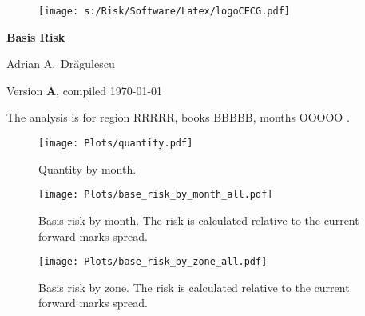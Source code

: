 \documentclass[letterpaper,10pt]{article}
\newcommand{\region}{RRRRR}
\newcommand{\book}{BBBBB}
\begin{document}
\begin{figure}
\texttt{[image: s:/Risk/Software/Latex/logoCECG.pdf]}
\hfill
{}
\end{figure}
 
\vspace*{0.5in}
\begin{center}
\LARGE\bf{Basis Risk}
\end{center}
\begin{center}
   Adrian A.\ Dr\u{a}gulescu
\end{center}
\begin{center}
  \small{Version {\bf A}, compiled \today}
\end{center}
\vspace*{1in}

The analysis is for region \region, books \book, months OOOOO .



\clearpage



\clearpage
\begin{figure}
\centerline{
 \texttt{[image: Plots/quantity.pdf]}} 
 \caption{Quantity by month.}
\end{figure}

\clearpage
\begin{figure}
\centerline{
 \texttt{[image: Plots/base\_risk\_by\_month\_all.pdf]}} 
 \caption{Basis risk by month.  The risk is calculated relative to the
 current forward marks spread.}
\end{figure}
\begin{figure}
\centerline{
 \texttt{[image: Plots/base\_risk\_by\_zone\_all.pdf]}} 
 \caption{Basis risk by zone.  The risk is calculated relative to the
 current forward marks spread.}
\end{figure}
\end{document}
